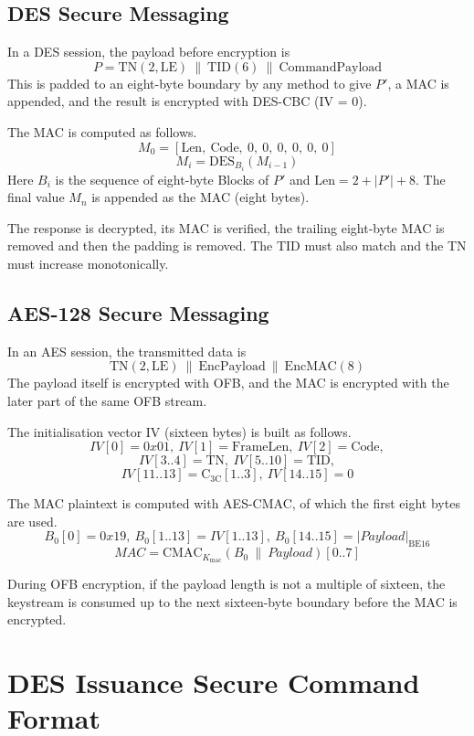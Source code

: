 \documentclass[a4paper,11pt]{report}
\begin{document}
\subsection{DES Secure Messaging}

In a DES session, the payload before encryption is
\[
    P = \mathrm{TN}(2,\mathrm{LE})\ \|\ \mathrm{TID}(6)\ \|\ \mathrm{CommandPayload}
\]
This is padded to an eight-byte boundary by any method to give $P'$, a MAC is appended, and the result is encrypted with DES-CBC (IV = 0).

The MAC is computed as follows.
\[
    M_0 = [\mathrm{Len},\ \mathrm{Code},\ 0,\ 0,\ 0,\ 0,\ 0,\ 0]
\]
\[
    M_i = \mathrm{DES}_{B_i}(M_{i-1})
\]
Here $B_i$ is the sequence of eight-byte Blocks of $P'$ and $\mathrm{Len}=2+|P'|+8$. The final value $M_n$ is appended as the MAC (eight bytes).

The response is decrypted, its MAC is verified, the trailing eight-byte MAC is removed and then the padding is removed. The TID must also match and the TN must increase monotonically.

\subsection{AES-128 Secure Messaging}

In an AES session, the transmitted data is
\[
    \mathrm{TN}(2,\mathrm{LE})\ \|\ \mathrm{EncPayload}\ \|\ \mathrm{EncMAC}(8)
\]
The payload itself is encrypted with OFB, and the MAC is encrypted with the later part of the same OFB stream.

The initialisation vector IV (sixteen bytes) is built as follows.
\[
    IV[0]=0x01,\ IV[1]=\mathrm{FrameLen},\ IV[2]=\mathrm{Code},
\]
\[
    IV[3..4]=\mathrm{TN},\ IV[5..10]=\mathrm{TID},
\]
\[
    IV[11..13]=\mathrm{C_{3C}}[1..3],\
    IV[14..15]=0
\]

The MAC plaintext is computed with AES-CMAC, of which the first eight bytes are used.
\[
    B_0[0]=0x19,\ B_0[1..13]=IV[1..13],\ B_0[14..15]=|Payload|_{\mathrm{BE16}}
\]
\[
    MAC = \mathrm{CMAC}_{K_{\mathrm{mac}}}(B_0\ \|\ Payload)[0..7]
\]

During OFB encryption, if the payload length is not a multiple of sixteen, the keystream is consumed up to the next sixteen-byte boundary before the MAC is encrypted.

\section{DES Issuance Secure Command Format}
\end{document}
